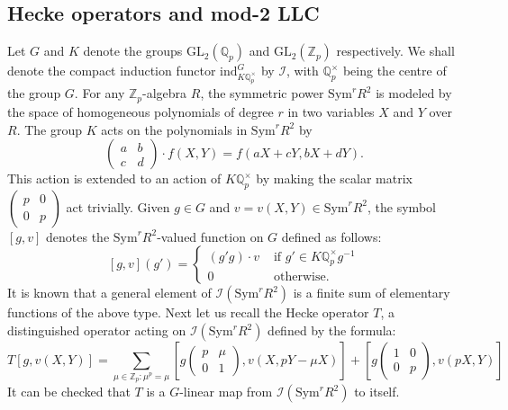 \documentclass[11pt, reqno]{amsart}
\numberwithin{equation}{section}
\newcommand\Q{\mathbb{Q}}
\newcommand\ind{\mathrm{ind}}
\newcommand\GL{{\mathrm{GL}}}
\newcommand{\Z}{\mathbb{Z}}
\newcommand\Sym{{\mathrm {Sym}}}
\theoremstyle{definition}
\theoremstyle{remark}
\theoremstyle{definition}
\theoremstyle{remark}
\theoremstyle{remark}
\begin{document}
\subsection{Hecke operators and mod-2 LLC}
  Let $G$ and $K$ denote the groups $\GL_{2}(\Q_{p})$ and $\GL_{2}(\Z_{p})$ respectively. We shall denote the compact induction functor $\ind_{K\Q_{p}^{\times}}^{G}$ by $\mathcal{I}$, with $\Q_p^\times$ being the centre of the group $G$. For any $\Z_{p}$-algebra $R$, the symmetric power  $\Sym^{r}R^{2}$ is modeled by the space of  homogeneous polynomials of degree $r$ in two variables $X$ and $Y$ over $R$. The group $K$ acts on the polynomials  in $ \Sym^{r}R^2$ by 
    $$ \left(\begin{smallmatrix}
      a & b\\
      c & d
  \end{smallmatrix}\right)\cdot f(X,Y)= f(aX+cY, bX+dY).$$ This action is extended to an action of $K\Q_{p}^{\times}$ by making the scalar matrix $\left(\begin{smallmatrix}
      p & 0\\
      0 & p
  \end{smallmatrix}\right) $ act trivially.
Given $g \in G$ and $v =v(X,Y)\in \Sym^{r}{R^{2}}$, the symbol $\left[g,v\right]$ denotes the $\Sym^{r}R^2$-valued function on $G$ defined as follows:   
       $$[g,v](g') = \begin{cases}
       (g'g)\cdot v &\text{ if } g' \in K{\Q}_{p}^{\times}g^{-1}\\
       0 & \text{ otherwise}.
       \end{cases}$$
       It is known that a general element of  $\mathcal{I}(\Sym^{r}R^{2})$ is a finite sum of elementary functions of the above type. Next let us recall the Hecke operator $T$, a distinguished operator acting on $\mathcal{I}(\Sym^r R^2)$ defined by the formula:
      \begin{equation}
          T[g,v(X,Y)] = \sum_{\mu \in \Z_{p}: \mu^{p}=\mu}\left[g\begin{pmatrix}
              p  & \mu\\
              0 & 1
          \end{pmatrix}, v(X, pY-\mu X)          \right] + \left[g\begin{pmatrix}
              1  & 0\\
              0 & p
          \end{pmatrix}, v(pX, Y) \right]     \end{equation} 
 It can be checked that $T$ is a $G$-linear map from $\mathcal{I}(\Sym^r R^2)$ to itself.
\end{document}
